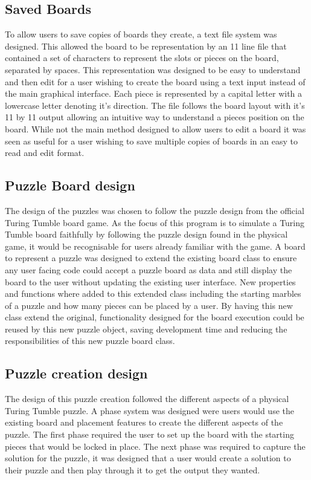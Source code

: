 \documentclass{l4proj}
\begin{document}
\subsection{Saved Boards}
To allow users to save copies of boards they create, a text file system was designed. This allowed the board to be representation by an 11 line file that contained a set of characters to represent the slots or pieces on the board, separated by spaces. This representation was designed to be easy to understand and then edit for a user wishing to create the board using a text input instead of the main graphical interface. Each piece is represented by a capital letter with a lowercase letter denoting it's direction. The file follows the board layout with it's 11 by 11 output allowing an intuitive way to understand a pieces position on the board. While not the main method designed to allow users to edit a board it was seen as useful for a user wishing to save multiple copies of boards in an easy to read and edit format.

\subsection{Puzzle Board design}
The design of the puzzles was chosen to follow the puzzle design from the official Turing Tumble board game. As the focus of this program is to simulate a Turing Tumble board faithfully by following the puzzle design found in the physical game, it would be recognisable for users already familiar with the game. A board to represent a puzzle was designed to extend the existing board class to ensure any user facing code could accept a puzzle board as data and still display the board to the user without updating the existing user interface. New properties and functions where added to this extended class including the starting marbles of a puzzle and how many pieces can be placed by a user. By having this new class extend the original, functionality designed for the board execution could be reused by this new puzzle object, saving development time and reducing the responsibilities of this new puzzle board class. 

\subsection{Puzzle creation design}
The design of this puzzle creation followed the different aspects of a physical Turing Tumble puzzle. A phase system was designed were users would use the existing board and placement features to create the different aspects of the puzzle. The first phase required the user to set up the board with the starting pieces that would be locked in place. The next phase was required to capture the solution for the puzzle, it was designed that a user would create a solution to their puzzle and then play through it to get the output they wanted. 
\end{document}
